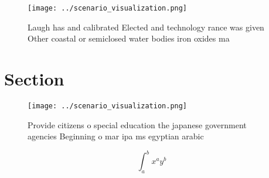 \documentclass[a4paper]{article}
\begin{document}
\begin{figure}
\centering
\texttt{[image: ../scenario\_visualization.png]}
\caption{Laugh has and calibrated Elected and technology rance was given Other coastal or semiclosed water bodies iron oxides ma
}
\end{figure}
 
\section{Section}

\begin{figure}
\centering
\texttt{[image: ../scenario\_visualization.png]}
\caption{Provide citizens o special education the japanese government agencies Beginning o mar ipa ms egyptian arabic 
}
\end{figure}
 
\[ \int_{a}^{b}{x^{a}y^{b}} \]
\end{document}
